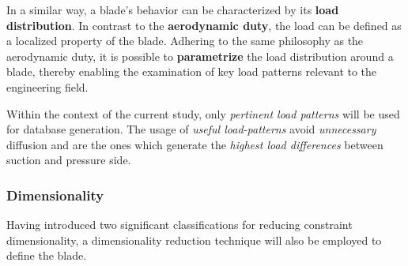 



In a similar way, a blade's behavior can be characterized by its \textbf{load distribution}. In contrast to the \textbf{aerodynamic duty}, 
the load can be defined as a localized property of the blade. Adhering to the same philosophy as the aerodynamic duty, 
it is possible to \textbf{parametrize} the load distribution around a blade, thereby enabling the examination 
of key load patterns relevant to the engineering field.

Within the context of the current study, only \textit{pertinent load patterns} will be used for database generation. 
The usage of \textit{useful load-patterns} avoid \textit{unnecessary} diffusion and are the ones which
generate the \textit{highest load differences} between suction and pressure side.   

\subsubsection{Dimensionality}




Having introduced two significant classifications for reducing constraint dimensionality, a dimensionality reduction technique will also be employed to define the blade.

